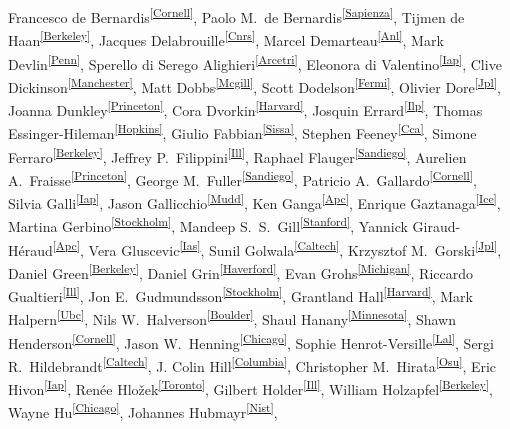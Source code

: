 Francesco de Bernardis\textsuperscript{\ref{Cornell}}, 
Paolo M.~de Bernardis\textsuperscript{\ref{Sapienza}},
Tijmen de Haan\textsuperscript{\ref{Berkeley}},
Jacques Delabrouille\textsuperscript{\ref{Cnrs}}, 
Marcel Demarteau\textsuperscript{\ref{Anl}},
Mark Devlin\textsuperscript{\ref{Penn}}, 
Sperello di Serego Alighieri\textsuperscript{\ref{Arcetri}}, 
Eleonora di Valentino\textsuperscript{\ref{Iap}},
Clive Dickinson\textsuperscript{\ref{Manchester}},
Matt Dobbs\textsuperscript{\ref{Mcgill}},
Scott Dodelson\textsuperscript{\ref{Fermi}}, 
Olivier Dore\textsuperscript{\ref{Jpl}},
Joanna Dunkley\textsuperscript{\ref{Princeton}},
Cora Dvorkin\textsuperscript{\ref{Harvard}},
Josquin Errard\textsuperscript{\ref{Ilp}},
Thomas Essinger-Hileman\textsuperscript{\ref{Hopkins}},
Giulio Fabbian\textsuperscript{\ref{Sissa}},
Stephen Feeney\textsuperscript{\ref{Cca}},
Simone Ferraro\textsuperscript{\ref{Berkeley}}, 
Jeffrey P.~Filippini\textsuperscript{\ref{Ill}},
Raphael Flauger\textsuperscript{\ref{Sandiego}}, 
Aurelien A.~Fraisse\textsuperscript{\ref{Princeton}},
George M.~Fuller\textsuperscript{\ref{Sandiego}},
Patricio A.~Gallardo\textsuperscript{\ref{Cornell}},
Silvia Galli\textsuperscript{\ref{Iap}},
Jason Gallicchio\textsuperscript{\ref{Mudd}},
Ken Ganga\textsuperscript{\ref{Apc}},
Enrique Gaztanaga\textsuperscript{\ref{Ice}},
Martina Gerbino\textsuperscript{\ref{Stockholm}},
Mandeep S.~S.~Gill\textsuperscript{\ref{Stanford}},
Yannick Giraud-Héraud\textsuperscript{\ref{Apc}},
Vera Gluscevic\textsuperscript{\ref{Ias}},
Sunil Golwala\textsuperscript{\ref{Caltech}},
Krzysztof M.~Gorski\textsuperscript{\ref{Jpl}},
Daniel Green\textsuperscript{\ref{Berkeley}},
Daniel Grin\textsuperscript{\ref{Haverford}},
Evan Grohs\textsuperscript{\ref{Michigan}},
Riccardo Gualtieri\textsuperscript{\ref{Ill}}, 
Jon E.~Gudmundsson\textsuperscript{\ref{Stockholm}},
Grantland Hall\textsuperscript{\ref{Harvard}},
Mark Halpern\textsuperscript{\ref{Ubc}},
Nils W.~Halverson\textsuperscript{\ref{Boulder}},
Shaul Hanany\textsuperscript{\ref{Minnesota}},
Shawn Henderson\textsuperscript{\ref{Cornell}},
Jason W.~Henning\textsuperscript{\ref{Chicago}},
Sophie Henrot-Versille\textsuperscript{\ref{Lal}},
Sergi R.~Hildebrandt\textsuperscript{\ref{Caltech}},
J. Colin Hill\textsuperscript{\ref{Columbia}},
Christopher M.~Hirata\textsuperscript{\ref{Osu}},
Eric Hivon\textsuperscript{\ref{Iap}},
Ren\'{e}e Hlo\v{z}ek\textsuperscript{\ref{Toronto}},
Gilbert Holder\textsuperscript{\ref{Ill}},
William Holzapfel\textsuperscript{\ref{Berkeley}},
Wayne Hu\textsuperscript{\ref{Chicago}},
Johannes Hubmayr\textsuperscript{\ref{Nist}},
